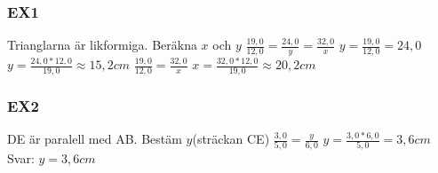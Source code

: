 \documentclass[a4paper,11pt]{article}
\begin{document}
\begin{flushleft}
\subsubsection{EX1}
Trianglarna är likformiga. Beräkna $x$ och $y$
$ \frac{19,0}{12,0} = \frac{24,0}{y} = \frac{32,0}{x} $\newline
$ y = \frac{19,0}{12,0} = 24,0 $\newline
$ y = \frac{24,0*12,0}{19,0}\approx15,2cm $\newline
$ \frac{19,0}{12,0} = \frac{32,0}{x} $\newline
$ x = \frac{32,0*12,0}{19,0}\approx20,2cm $\newline
\subsubsection{EX2}
DE är paralell med AB. Bestäm $y$(sträckan CE)
$ \frac{3,0}{5,0} = \frac{y}{6,0} $\newline
$ y = \frac{3,0*6,0}{5,0} = 3,6cm$\newline
Svar: $ y = 3,6cm $
\end{flushleft}
\end{document}
